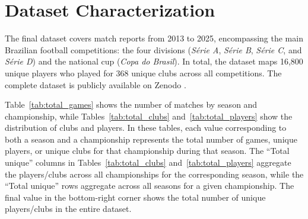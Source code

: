 \section{Dataset Characterization}
\label{sec:dataset_stats}

The final dataset covers match reports from 2013 to 2025, encompassing the main Brazilian football competitions: the four divisions (\textit{Série A}, \textit{Série B}, \textit{Série C}, and \textit{Série D}) and the national cup (\textit{Copa do Brasil}).
In total, the dataset maps 16,800 unique players who played for 368 unique clubs across all competitions.
The complete dataset is publicly available on Zenodo \cite{michels_2026_dataset}.

Table~\ref{tab:total_games} shows the number of matches by season and championship, while Tables~\ref{tab:total_clubs} and~\ref{tab:total_players} show the distribution of clubs and players.
In these tables, each value corresponding to both a season and a championship represents the total number of games, unique players, or unique clubs for that championship during that season.
The ``Total unique'' columns in Tables~\ref{tab:total_clubs} and~\ref{tab:total_players} aggregate the players/clubs across all championships for the corresponding season, while the ``Total unique'' rows aggregate across all seasons for a given championship.
The final value in the bottom-right corner shows the total number of unique players/clubs in the entire dataset.

